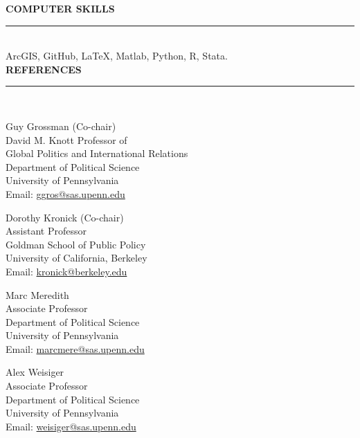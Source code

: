 \documentclass[10pt, english]{article}
\begin{document}
\vspace{0.2cm}
\textbf{COMPUTER SKILLS}

\noindent\rule{\textwidth}{1pt}\\

ArcGIS, GitHub, \LaTeX, Matlab, Python, R, Stata.\\

\vspace{0.2cm}
\textbf{REFERENCES}

\noindent\rule{\textwidth}{1pt}\\

\begin{minipage}[t]{0.5\textwidth}
	Guy Grossman (Co-chair)\\
	David M. Knott Professor of\\
	Global Politics and International Relations\\
	Department of Political Science\\
	University of Pennsylvania\\
	Email: \href{mailto:ggros@sas.upenn.edu}{ggros@sas.upenn.edu}\\
\end{minipage}%
\begin{minipage}[t]{0.5\textwidth}
	Dorothy Kronick (Co-chair)\\
	Assistant Professor\\
	Goldman School of Public Policy\\
	University of California, Berkeley\\
	Email: \href{mailto:kronick@berkeley.edu}{kronick@berkeley.edu}\\
\end{minipage}

\vspace{1em}

\begin{minipage}[t]{0.5\textwidth}
	Marc Meredith\\
	Associate Professor\\
	Department of Political Science\\
	University of Pennsylvania\\
	Email: \href{mailto:marcmere@sas.upenn.edu}{marcmere@sas.upenn.edu}\\
\end{minipage}%
\begin{minipage}[t]{0.5\textwidth}
	Alex Weisiger\\
	Associate Professor\\
	Department of Political Science\\
	University of Pennsylvania\\
	Email: \href{mailto:weisiger@sas.upenn.edu}{weisiger@sas.upenn.edu}\\
\end{minipage}
\end{document}

